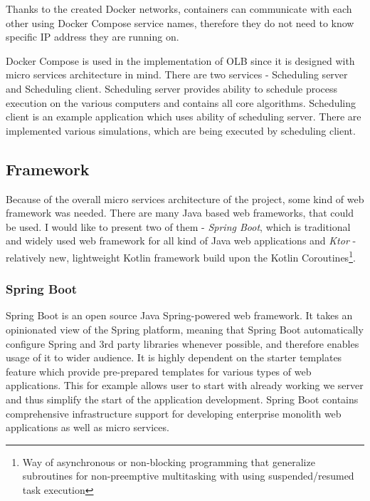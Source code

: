 Thanks to the created Docker networks,
containers can communicate with each other using Docker Compose service names,
therefore they do not need to know specific IP address they are running on.

Docker Compose is used in the implementation of OLB since it is designed with micro services architecture in mind.
There are two services - Scheduling server and Scheduling client.
Scheduling server provides ability to schedule process execution on the various computers
and contains all core algorithms.
Scheduling client is an example application which uses ability of scheduling server. 
There are implemented various simulations,
which are being executed by scheduling client.  

\subsection{Framework}
Because of the overall micro services architecture of the project,
some kind of web framework was needed.
There are many Java based web frameworks,
that could be used. 
I would like to present two of them - \textit{Spring Boot}, 
which is traditional and widely used web framework for all kind of Java web applications
and \textit{Ktor} - relatively new, 
lightweight Kotlin framework build upon the Kotlin Coroutines\footnote{Way of asynchronous or non-blocking programming
that generalize subroutines for non-preemptive multitasking with using suspended/resumed task execution}.


\subsubsection{Spring Boot}
Spring Boot %
is an open source Java Spring-powered web framework.
It takes an opinionated view of the Spring platform,
meaning that Spring Boot automatically configure Spring and 3rd party libraries whenever possible,
and therefore enables usage of it to wider audience.
It is highly dependent on the starter templates feature which provide pre-prepared templates for various types of web applications.
This for example allows user to start with already working we server
and thus simplify the start of the application development.
Spring Boot contains comprehensive infrastructure support for developing enterprise monolith web applications as well as micro services. 

